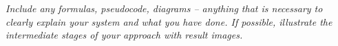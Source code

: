 \textit{Include any formulas, pseudocode, diagrams -- anything that is necessary to clearly explain your system and what you have done. If possible, illustrate the intermediate stages of your approach with result images.}
